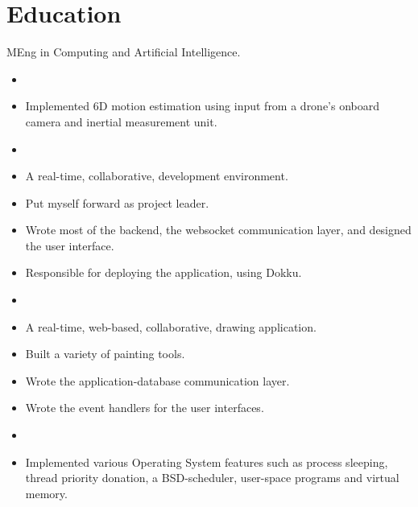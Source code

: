 \documentclass{jcgcv}
\begin{document}
\begin{column}

\section{Education}
MEng in Computing and Artificial Intelligence.

\begin{adjustwidth}{0.3cm}{}

\begin{itemize}
  \item {}
  \item Implemented 6D motion estimation using input from a drone's onboard camera and inertial measurement unit.
\end{itemize}

\begin{itemize}
  \item {}
  \item A real-time, collaborative, development environment.
  \item Put myself forward as project leader.
  \item Wrote most of the backend, the websocket communication layer, and designed the user interface.
  \item Responsible for deploying the application, using Dokku.
\end{itemize}

\begin{itemize}
  \item {}
  \item A real-time, web-based, collaborative, drawing application.
  \item Built a variety of painting tools.
  \item Wrote the application-database communication layer.
  \item Wrote the event handlers for the user interfaces.
\end{itemize}

\begin{itemize}
  \item {}
  \item Implemented various Operating System features such as process sleeping, thread priority donation, a BSD-scheduler, user-space programs and virtual memory.
\end{itemize}


\end{adjustwidth}
\end{column}
\end{document}

